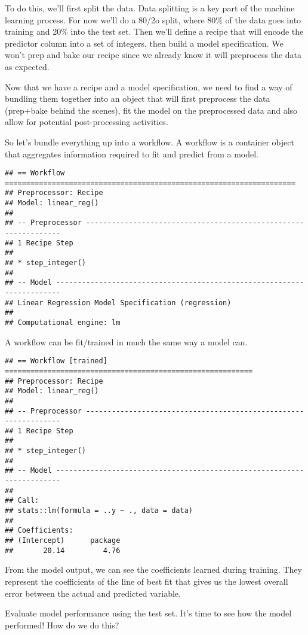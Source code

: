 \documentclass[
]{article}
\begin{document}
To do this, we'll first split the data. Data splitting is a key part of
the machine learning process. For now we'll do a 80/2o split, where 80\%
of the data goes into training and 20\% into the test set. Then we'll
define a recipe that will encode the predictor column into a set of
integers, then build a model specification. We won't prep and bake our
recipe since we already know it will preprocess the data as expected.

Now that we have a recipe and a model specification, we need to find a
way of bundling them together into an object that will first preprocess
the data (prep+bake behind the scenes), fit the model on the
preprocessed data and also allow for potential post-processing
activities.

So let's bundle everything up into a workflow. A workflow is a container
object that aggregates information required to fit and predict from a
model.

\begin{verbatim}
## == Workflow ====================================================================
## Preprocessor: Recipe
## Model: linear_reg()
## 
## -- Preprocessor ----------------------------------------------------------------
## 1 Recipe Step
## 
## * step_integer()
## 
## -- Model -----------------------------------------------------------------------
## Linear Regression Model Specification (regression)
## 
## Computational engine: lm
\end{verbatim}

A workflow can be fit/trained in much the same way a model can.

\begin{verbatim}
## == Workflow [trained] ==========================================================
## Preprocessor: Recipe
## Model: linear_reg()
## 
## -- Preprocessor ----------------------------------------------------------------
## 1 Recipe Step
## 
## * step_integer()
## 
## -- Model -----------------------------------------------------------------------
## 
## Call:
## stats::lm(formula = ..y ~ ., data = data)
## 
## Coefficients:
## (Intercept)      package  
##       20.14         4.76
\end{verbatim}

From the model output, we can see the coefficients learned during
training. They represent the coefficients of the line of best fit that
gives us the lowest overall error between the actual and predicted
variable.

Evaluate model performance using the test set. It's time to see how the
model performed! How do we do this?
\end{document}
